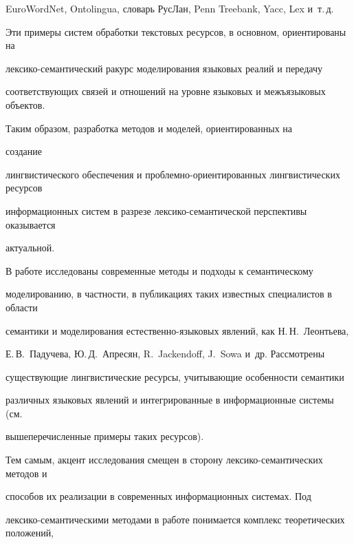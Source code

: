 EuroWordNet, Ontolingua, словарь РусЛан, Penn Treebank, Yacc, Lex и~т.\,д.


   


   Эти примеры систем обработки текстовых ресурсов, в основном, ориентированы на 


лексико-семантический ракурс моделирования языковых реалий и передачу 


соответствующих связей и отношений на уровне языковых и межъязыковых объектов. 


Таким образом, разработка методов и моделей, ориентированных на\linebreak\vspace*{-12pt}


\pagebreak





\noindent


 создание 


лингвистического обеспечения и проблемно-ориентированных лингвистических ресурсов 


информационных систем в разрезе лексико-семантической перспективы оказывается 


актуальной.


   


   В работе исследованы современные методы и подходы к семантическому 


моделированию, в частности, в публикациях таких известных специалистов в области 


семантики и моделирования естественно-языковых явлений, как Н.\,Н.~Леонтьева, 


Е.\,В.~Падучева, Ю.\,Д.~Апресян, R.~Jackendoff, J.~Sowa и~др. Рассмотрены 


существующие лингвистические ресурсы, учитывающие особенности семантики 


различных языковых явлений и интегрированные в информационные системы (см.\ 


вышеперечисленные примеры таких ресурсов).


   


   Тем самым, акцент исследования смещен в сторону лексико-семантических методов и 


способов их реализации в современных информационных системах. Под 


лексико-семантическими методами в работе понимается комплекс теоретических положений, 


